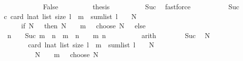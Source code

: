 \begin{isabellebody}
\ \ \ \ \isamarkupfalse%
\isanewline
\ \ \ \ \ \ \isamarkupfalse%
\ False\isanewline
\ \ \ \ \ \ \isamarkupfalse%
\ \isamarkupfalse%
\ {\isacharquery}{\kern0pt}thesis\isanewline
\ \ \ \ \ \ \ \ \isamarkupfalse%
\ Suc\ \isamarkupfalse%
\ fastforce\isanewline
\ \ \ \ \isamarkupfalse%
\isanewline
\ \ \ \ \isamarkupfalse%
\ Suc\ \isamarkupfalse%
\ c{}{\isacharcolon}{\kern0pt}\ {\isachardoublequoteopen}card\ {\isacharbraceleft}{\kern0pt}l{\isacharcolon}{\kern0pt}{\isacharcolon}{\kern0pt}nat\ list{\isachardot}{\kern0pt}\ size\ l\ {\isacharequal}{\kern0pt}\ m\ {\isasymand}\ sum{\isacharunderscore}{\kern0pt}list\ l\ {\isacharplus}{\kern0pt}\ {}\ {\isacharequal}{\kern0pt}\ N{\isacharbraceright}{\kern0pt}\ {\isacharequal}{\kern0pt}\isanewline
\ \ \ \ \ \ {\isacharparenleft}{\kern0pt}if\ N\ {\isachargreater}{\kern0pt}\ {}\ then\ {\isacharparenleft}{\kern0pt}{\isacharparenleft}{\kern0pt}N\ {\isacharminus}{\kern0pt}\ {}{\isacharparenright}{\kern0pt}\ {\isacharplus}{\kern0pt}\ m\ {\isacharminus}{\kern0pt}\ {}{\isacharparenright}{\kern0pt}\ choose\ {\isacharparenleft}{\kern0pt}N\ {\isacharminus}{\kern0pt}\ {}{\isacharparenright}{\kern0pt}\ else\ {}{\isacharparenright}{\kern0pt}{\isachardoublequoteclose}\isanewline
\ \ \ \ \isamarkupfalse%
\ {\isacharminus}{\kern0pt}\isanewline
\ \ \ \ \ \ \isamarkupfalse%
\ {\isacharasterisk}{\kern0pt}{\isacharcolon}{\kern0pt}\ {\isachardoublequoteopen}n\ {\isachargreater}{\kern0pt}\ {}\ {\isasymLongrightarrow}\ Suc\ m\ {\isacharequal}{\kern0pt}\ n\ {\isasymlongleftrightarrow}\ m\ {\isacharequal}{\kern0pt}\ n\ {\isacharminus}{\kern0pt}\ {}{\isachardoublequoteclose}\ \ m\ n\isanewline
\ \ \ \ \ \ \ \ \isamarkupfalse%
\ arith\isanewline
\ \ \ \ \ \ \isamarkupfalse%
\ Suc\ \isamarkupfalse%
\ {\isachardoublequoteopen}N\ {\isachargreater}{\kern0pt}\ {}\ {\isasymLongrightarrow}\isanewline
\ \ \ \ \ \ \ \ card\ {\isacharbraceleft}{\kern0pt}l{\isacharcolon}{\kern0pt}{\isacharcolon}{\kern0pt}nat\ list{\isachardot}{\kern0pt}\ size\ l\ {\isacharequal}{\kern0pt}\ m\ {\isasymand}\ sum{\isacharunderscore}{\kern0pt}list\ l\ {\isacharplus}{\kern0pt}\ {}\ {\isacharequal}{\kern0pt}\ N{\isacharbraceright}{\kern0pt}\ {\isacharequal}{\kern0pt}\isanewline
\ \ \ \ \ \ \ \ \ \ {\isacharparenleft}{\kern0pt}{\isacharparenleft}{\kern0pt}N\ {\isacharminus}{\kern0pt}\ {}{\isacharparenright}{\kern0pt}\ {\isacharplus}{\kern0pt}\ m\ {\isacharminus}{\kern0pt}\ {}{\isacharparenright}{\kern0pt}\ choose\ {\isacharparenleft}{\kern0pt}N\ {\isacharminus}{\kern0pt}\ {}{\isacharparenright}{\kern0pt}{\isachardoublequoteclose}\isanewline

\end{isabellebody}
